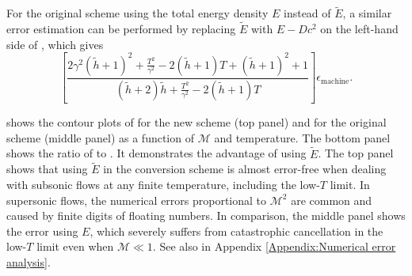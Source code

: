 \documentclass[twocolumn]{aastex63}
\begin{document}
For the original scheme using the total energy density $E$ instead of $\tilde{E}$, a similar error estimation can be performed by replacing $\tilde{E}$ with $E-Dc^2$ on the left-hand side of , which gives
\begin{equation}
    \left[\frac{2\gamma^2\left(\tilde{h}+1\right)^2+\frac{T^2}{\gamma^2}-2\left(\tilde{h}+1\right)T+\left(\tilde{h}+1\right)^2+1}{\left(\tilde{h}+2\right)\tilde{h}+\frac{T^2}{\gamma^2}-2\left(\tilde{h}+1\right)T}\right]\epsilon_{\text{machine}}.
\label{eq:OriRelativeError}
\end{equation}

 shows the contour plots of  for the new scheme (top panel) and  for the original scheme (middle panel) as a function of $\mathscr{M}$ and temperature. The bottom panel shows the ratio of  to . It demonstrates the advantage of using $\tilde{E}$. The top panel shows that using $\tilde{E}$ in the conversion scheme is almost error-free when dealing with subsonic flows at any finite temperature, including the low-$T$ limit. In supersonic flows, the numerical errors proportional to $\mathscr{M}^2$ are common and caused by finite digits of floating numbers. In comparison, the middle panel shows the error using $E$, which severely suffers from catastrophic cancellation in the low-$T$ limit even when $\mathscr{M}\ll 1$. See also  in Appendix \ref{Appendix:Numerical error analysis}.
\end{document}
